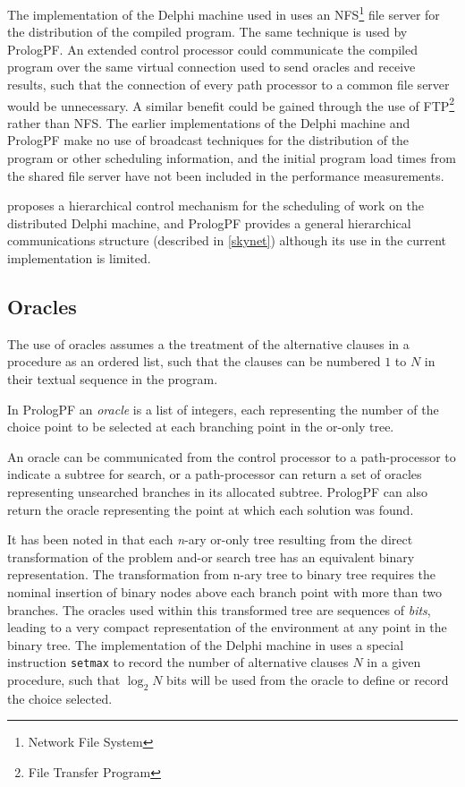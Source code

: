 The implementation of the Delphi machine used in \cite{Kle91,Sar95} uses an
 NFS\footnote{Network File System} file
server for the distribution of the compiled program.  The same technique is used by PrologPF.
An extended control processor could communicate the compiled program over the same
virtual connection used to send oracles and receive results, such that the connection of
every path processor to a common file server would be unnecessary.  A similar benefit could
be gained through the use of FTP\footnote{File Transfer Program} rather than NFS.
The earlier implementations of the Delphi machine and PrologPF make no use of broadcast
techniques for the distribution of the program or other scheduling information, and
the initial program load times from the shared file server have not been included in the
performance measurements.

\cite{Bar92} proposes a hierarchical control mechanism for the scheduling of work on
the distributed Delphi machine, and PrologPF provides a general hierarchical communications
structure (described in \ref{skynet}) although its use in the current implementation is
limited.

\subsection{Oracles}

The use of oracles assumes a the treatment of the alternative clauses in a procedure
as an ordered list, such that the clauses can be numbered $1$ to $N$ in their
textual sequence in the program.

In PrologPF an \textit{oracle}
is a list of integers, each representing the number of the choice
point to be selected at each branching point in the or-only tree. 

An oracle can be communicated from the control processor to a path-processor to
indicate a subtree for search, or a path-processor can return a set of oracles representing
unsearched branches in its allocated subtree.  PrologPF can also return the oracle representing
the point at which each solution was found.

It has been noted in
\cite{CA87,Kle91} that each \textit{n}-ary or-only tree resulting from the direct
transformation of the problem and-or search tree has an equivalent binary representation.
The transformation from n-ary tree to binary tree requires the nominal insertion
of binary nodes above each branch point with more than two branches.  The oracles used
within this transformed tree are sequences of \textit{bits}, leading to a very compact
representation of the environment at any point in the binary tree.  The implementation of
the Delphi machine in \cite{Kle91} uses a special instruction \texttt{setmax} to record
the number of alternative clauses $N$ in a given procedure, such that $\log _2 N$ bits will
be used from the oracle to define or record the choice selected.

